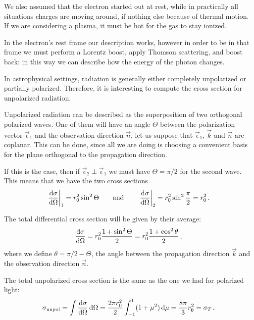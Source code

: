 \documentclass[main.tex]{subfiles}
\begin{document}
We also assumed that the electron started out at rest, while in practically all situations charges are moving around, if nothing else because of thermal motion. 
If we are considering a plasma, it must be hot for the gas to stay ionized. 

In the electron's rest frame our description works, however in order to be in that frame we must perform a Lorentz boost, apply Thomson scattering, and boost back: in this way we can describe how the energy of the photon changes.

In astrophysical settings, radiation is generally either completely unpolarized or partially polarized. Therefore, it is interesting to compute the cross section for unpolarized radiation.

Unpolarized radiation can be described as the superposition of two orthogonal polarized waves. One of them will have an angle \(\Theta \) between the polarization vector \(\vec{\epsilon}_1 \) and the observation direction \(\vec{n}\), let us suppose that \(\vec{\epsilon}_1 \), \(\vec{k}\) and \(\vec{n}\) are coplanar. 
This can be done, since all we are doing is choosing a convenient basis for the plane orthogonal to the propagation direction.

If this is the case, then if \(\vec{\epsilon}_2 \perp \vec{\epsilon}_1\) we must have \(\Theta = \pi / 2\) for the second wave. This means that we have the two cross sections 
%
\begin{align}
\eval{\dv{\sigma }{\Omega }}_{1} = r_0^2 \sin^2 \Theta 
\qquad \text{and} \qquad
\eval{\dv{\sigma }{\Omega }}_{2} = r_0^2 \sin^2 \frac{\pi}{2} = r_0^2
\,.
\end{align}

The total differential cross section will be given by their average: 
%
\begin{align}
\dv{\sigma }{\Omega } = r_0^2 \frac{1 + \sin^2 \Theta }{2} = r_0^2 \frac{1 + \cos^2 \theta }{2}
\,,
\end{align}
%
where we define \(\theta = \pi /2 - \Theta \), the angle between the propagation direction \(\vec{k}\) and the observation direction \(\vec{n}\). 

The total unpolarized cross section is the same as the one we had for polarized light:
%
\begin{align}
\sigma _{\text{unpol}} = \int \dv{\sigma }{\Omega } \dd{\Omega } 
= \frac{2 \pi r_0^2}{2} \int_{-1}^{1} (1 + \mu^2) \dd{\mu }
=\frac{8 \pi }{3} r_0^2 = \sigma_{T}
\,.
\end{align}
\end{document}
